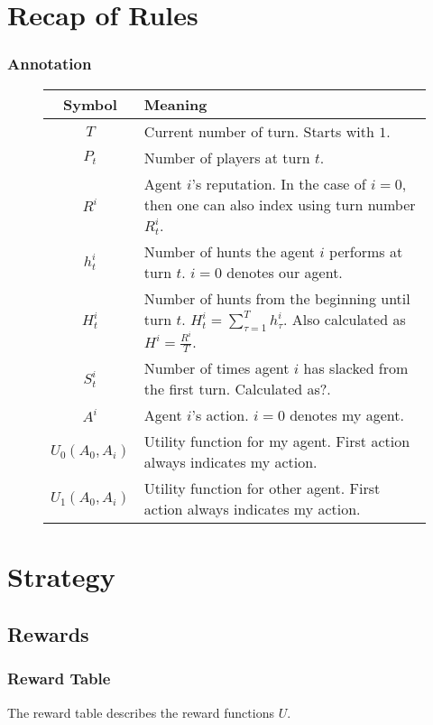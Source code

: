 \documentclass[10pt,fleqn]{article}
\begin{document}
\section{Recap of Rules}

\subsubsection{Annotation}

\begin{figure}[h!]
  \centering
  \begin{tabular}{|c|l|}
    \hline
    Symbol & Meaning \\
    \hline \hline
    $T$ & Current number of turn. Starts with $1$. \\
    \hline
    $P_t$ & Number of players at turn $t$. \\
    \hline
    $R^i$ & Agent $i$'s reputation. In the case of $i = 0$, then one can also
    index using turn number $R^i_t$. \\
    \hline
    $h^i_t$ & Number of hunts the agent $i$ performs at turn $t$. $i = 0$ denotes
    our agent. \\
    \hline
    $H^i_t$ & Number of hunts from the beginning until turn $t$. $H^i_t =
    \sum_{\tau = 1}^T h^i_\tau$. Also calculated as $H^i = \frac{R^i}{T}$. \\
    \hline
    $S^i_t$ & Number of times agent $i$ has slacked from the first turn.
    Calculated as?. \\
    \hline
    $A^i$ & Agent $i$'s action. $i = 0$ denotes my agent. \\
    \hline
    $U_0(A_0, A_i)$ & Utility function for my agent. First action always indicates
    my action. \\
    \hline
    $U_1(A_0, A_i)$ & Utility function for other agent. First action always indicates
    my action. \\
    \hline
  \end{tabular}
\end{figure}

\section{Strategy}

\subsection{Rewards}

\subsubsection{Reward Table}
The reward table describes the reward functions $U$.
\end{document}
